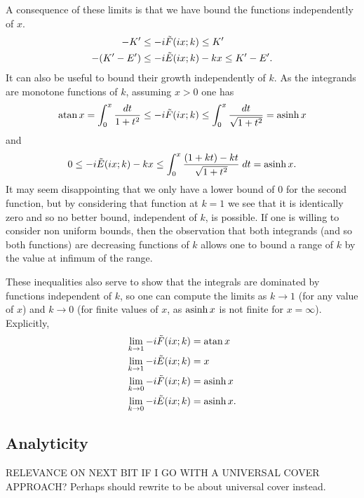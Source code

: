 A consequence of these limits is that we have bound the functions independently of $x$.
\begin{align}
-K' \leq -i &\tilde{F}(i x;k) \leq K' \\
- (K' - E') \leq -i &\tilde E(i x; k) - k x \leq K' - E'. \label{eqn:tildeEatInf}
\end{align}
It can also be useful to bound their growth independently of $k$. As the integrands are monotone functions of $k$, assuming $x>0$ one has
\[
\operatorname{atan} {x} = \int_0 ^x \frac{dt}{1+t^2} \leq -i \tilde{F}(i x;k) \leq \int_0 ^x \frac{dt}{\sqrt{1+t^2}} = \operatorname{asinh} x
\]
and
\[
0 \leq -i \tilde E(i x; k) - k x \leq
\int_0^x \frac{(1+kt) - kt}{\sqrt{1+t^2}}\;dt = \operatorname{asinh} x.
\]
It may seem disappointing that we only have a lower bound of $0$ for the second function, but by considering that function at $k=1$ we see that it is identically zero and so no better bound, independent of $k$, is possible. If one is willing to consider non uniform bounds, then the observation that both integrands (and so both functions) are decreasing functions of $k$ allows one to bound a range of $k$ by the value at infimum of the range.

These inequalities also serve to show that the integrals are dominated by functions independent of $k$, so one can compute the limits as $k \to 1$ (for any value of $x$) and $k \to 0$ (for finite values of $x$, as $\operatorname{asinh} x$ is not finite for $x=\infty$). Explicitly,
\begin{align}
\lim_{k\to 1} -i \tilde{F}(i x; k) &= \operatorname{atan} {x} \\
\lim_{k\to 1} -i \tilde{E}(i x; k) &= x \\
\lim_{k\to 0} -i \tilde{F}(i x; k) &= \operatorname{asinh} {x} \\
\lim_{k\to 0} -i \tilde{E}(i x; k) &= \operatorname{asinh} {x}.
\end{align}

\subsection{Analyticity}
\label{sub:Analyticity}

RELEVANCE ON NEXT BIT IF I GO WITH A UNIVERSAL COVER APPROACH? Perhaps should rewrite to be about universal cover instead.

